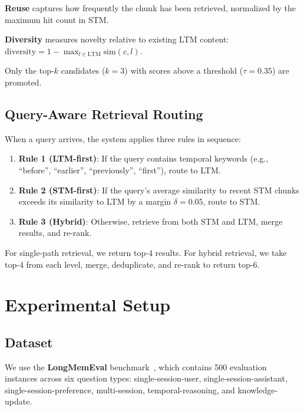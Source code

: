 \documentclass{article}
\begin{document}
\textbf{Reuse} captures how frequently the chunk has been retrieved, normalized by the maximum hit count in STM.

\textbf{Diversity} measures novelty relative to existing LTM content: $\text{diversity} = 1 - \max_{l \in \text{LTM}} \text{sim}(c, l)$.

Only the top-$k$ candidates ($k=3$) with scores above a threshold ($\tau = 0.35$) are promoted.

\subsection{Query-Aware Retrieval Routing}

When a query arrives, the system applies three rules in sequence:

\begin{enumerate}
    \item \textbf{Rule 1 (LTM-first)}: If the query contains temporal keywords (e.g., ``before'', ``earlier'', ``previously'', ``first''), route to LTM.
    \item \textbf{Rule 2 (STM-first)}: If the query's average similarity to recent STM chunks exceeds its similarity to LTM by a margin $\delta = 0.05$, route to STM.
    \item \textbf{Rule 3 (Hybrid)}: Otherwise, retrieve from both STM and LTM, merge results, and re-rank.
\end{enumerate}

For single-path retrieval, we return top-4 results. For hybrid retrieval, we take top-4 from each level, merge, deduplicate, and re-rank to return top-6.

\section{Experimental Setup}

\subsection{Dataset}

We use the \textbf{LongMemEval} benchmark~\cite{longmemeval}, which contains 500 evaluation instances across six question types: single-session-user, single-session-assistant, single-session-preference, multi-session, temporal-reasoning, and knowledge-update.
\end{document}
